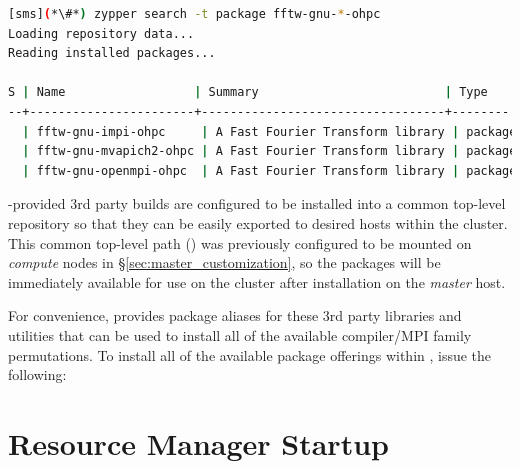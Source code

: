 \documentclass[letterpaper]{article}
\begin{document}
\begin{lstlisting}[language=bash]
[sms](*\#*) zypper search -t package fftw-gnu-*-ohpc
Loading repository data...
Reading installed packages...

S | Name                  | Summary                          | Type   
--+-----------------------+----------------------------------+--------
  | fftw-gnu-impi-ohpc     | A Fast Fourier Transform library | package
  | fftw-gnu-mvapich2-ohpc | A Fast Fourier Transform library | package
  | fftw-gnu-openmpi-ohpc  | A Fast Fourier Transform library | package
\end{lstlisting}

\begin{center}
\begin{tcolorbox}[]
\small
\OHPC{}-provided 3rd party builds are configured to be installed
into a common top-level repository so that they can be easily exported to
desired hosts within the cluster. This common top-level path
() was previously configured to be mounted on {\em
 compute} nodes in \S\ref{sec:master_customization}, so the packages will be
immediately available for use on the cluster after installation on the {\em
 master} host.
\end{tcolorbox}
\end{center}

For convenience, \OHPC{} provides package aliases for these 3rd
party libraries and utilities that can be used to install all of the available
compiler/MPI family permutations. To install all of the available package
offerings within \OHPC{}, issue the following:




\vspace*{0.2cm}

\section{Resource Manager Startup} \label{sec:rms_startup}


\end{document}
